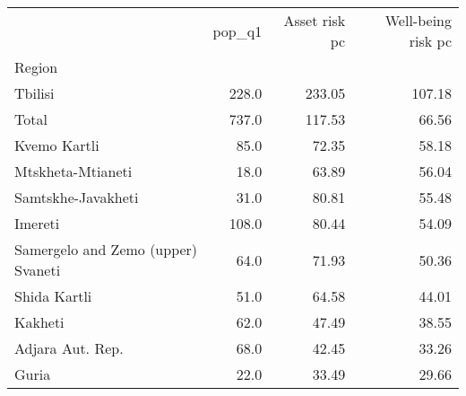 \begin{tabular}{lrrr}
\toprule
{} &  pop\_q1 &  Asset risk pc &  Well-being risk pc \\
Region                             &         &                &                     \\
\midrule
Tbilisi                            &   228.0 &         233.05 &              107.18 \\
Total                              &   737.0 &         117.53 &               66.56 \\
Kvemo Kartli                       &    85.0 &          72.35 &               58.18 \\
Mtskheta-Mtianeti                  &    18.0 &          63.89 &               56.04 \\
Samtskhe-Javakheti                 &    31.0 &          80.81 &               55.48 \\
Imereti                            &   108.0 &          80.44 &               54.09 \\
Samergelo and Zemo (upper) Svaneti &    64.0 &          71.93 &               50.36 \\
Shida Kartli                       &    51.0 &          64.58 &               44.01 \\
Kakheti                            &    62.0 &          47.49 &               38.55 \\
Adjara Aut. Rep.                   &    68.0 &          42.45 &               33.26 \\
Guria                              &    22.0 &          33.49 &               29.66 \\
\bottomrule
\end{tabular}
